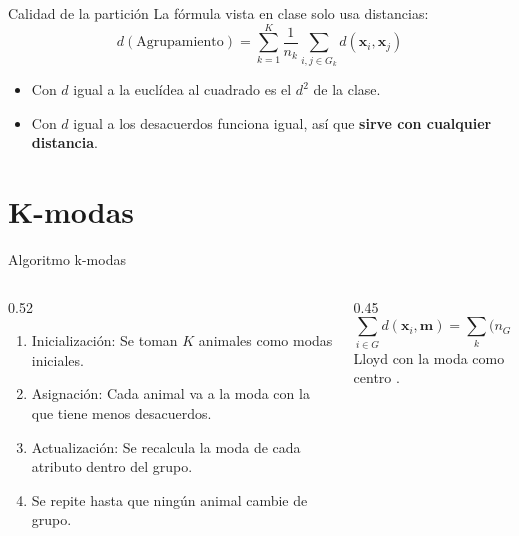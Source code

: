 \documentclass[aspectratio=169]{beamer}
\begin{document}
\begin{frame}{Calidad de la partición}
  La fórmula vista en clase solo usa distancias:
  \[
    d(\text{Agrupamiento}) = \sum_{k=1}^{K} \frac{1}{n_k}
      \sum_{i,j \in G_k} d(\mathbf{x}_i,\mathbf{x}_j)
  \]
  \begin{itemize}
    \item Con $d$ igual a la euclídea al cuadrado es el $d^2$ de la clase.
    \item Con $d$ igual a los desacuerdos funciona igual, así que
      \textbf{sirve con cualquier distancia}.
  \end{itemize}
\end{frame}

\section{K-modas}

\begin{frame}{Algoritmo k-modas}
  \begin{columns}[T]
    \begin{column}{0.52\textwidth}
      \begin{enumerate}
        \item Inicialización: Se toman $K$ animales como modas iniciales.
        \item Asignación: Cada animal va a la moda con la que tiene menos
          desacuerdos.
        \item Actualización: Se recalcula la moda de cada atributo dentro
          del grupo.
        \item Se repite hasta que ningún animal cambie de grupo.
      \end{enumerate}
    \end{column}
    \begin{column}{0.45\textwidth}
      \[
        \sum_{i \in G} d(\mathbf{x}_i,\mathbf{m})
          = \sum_{k}\bigl(n_G - n_k(m_k)\bigr)
      \]
      \footnotesize Lloyd con la moda como centro \parencite{huang1998}.
    \end{column}
  \end{columns}
\end{frame}
\end{document}

